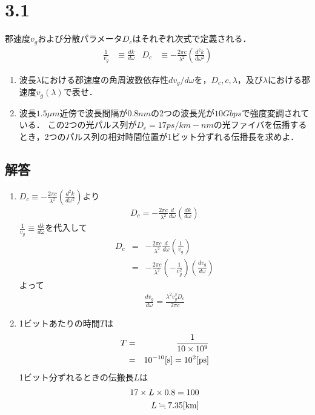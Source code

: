 \section*{3.1}
郡速度$v_g$および分散パラメータ$D_c$はそれぞれ次式で定義される．
\begin{align*}
    \frac{1}{v_g}&\equiv \frac{dk}{d\omega} & D_c&\equiv -\frac{2\pi c}{\lambda^2}\left(\frac{d^2k}{d\omega^2}\right)
\end{align*}
\begin{enumerate}
    \renewcommand{\labelenumi}{(\alph{enumi})}
    \item 波長$\lambda$における郡速度の角周波数依存性$dv_g/d\omega$を，$D_c, c, \lambda$，及び$\lambda$における郡速度$v_g(\lambda)$で表せ．
    \item 波長$1.5\mu m$近傍で波長間隔が$0.8nm$の2つの波長光が$10Gbps$で強度変調されている．
    この2つの光パルス列が$D_c=17ps/km-nm$の光ファイバを伝播するとき，2つのパルス列の相対時間位置が1ビット分ずれる伝播長を求めよ．
\end{enumerate}

\subsection*{解答}
\begin{enumerate}
    \renewcommand{\labelenumi}{(\alph{enumi})}
    \item 
    $D_c\equiv -\frac{2\pi c}{\lambda^2}\left(\frac{d^2k}{d\omega^2}\right)$より
    \begin{eqnarray*}
        D_c=-\frac{2\pi c}{\lambda^2}\frac{d}{d\omega}\left(\frac{dk}{d\omega}\right)
    \end{eqnarray*}
    $\frac{1}{v_g}\equiv \frac{dk}{d\omega}$を代入して
    \begin{eqnarray*}
        D_c&=&-\frac{2\pi c}{\lambda^2}\frac{d}{d\omega}\left(\frac{1}{v_g}\right)\\
        &=&-\frac{2\pi c}{\lambda^2}\left(-\frac{1}{v_g^2}\right)\left(\frac{dv_g}{d\omega}\right)
    \end{eqnarray*}
    よって
    \begin{eqnarray*}
        \frac{dv_g}{d\omega}=\frac{\lambda^2v_g^2D_c}{2\pi c}
    \end{eqnarray*}
    \item
    1ビットあたりの時間$T$は
    \begin{eqnarray*}
        T&=&\frac{1}{10\times 10^9}\\
        &=&10^{-10}[{\rm s}]=10^2[{\rm ps}]
    \end{eqnarray*}
    1ビット分ずれるときの伝搬長$L$は
    \begin{eqnarray*}
        17\times L \times 0.8=100\\
        L\fallingdotseq 7.35[{\rm km}]
    \end{eqnarray*}
\end{enumerate}

